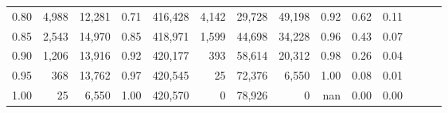 \begin{tabular}{rrrrrrrrrrrrrr}
0.80 &   4,988 &  12,281 &  0.71 &  416,428 &    4,142 &  29,728 &  49,198 &  0.92 &  0.62 &      0.11 \\
0.85 &   2,543 &  14,970 &  0.85 &  418,971 &    1,599 &  44,698 &  34,228 &  0.96 &  0.43 &      0.07 \\
0.90 &   1,206 &  13,916 &  0.92 &  420,177 &      393 &  58,614 &  20,312 &  0.98 &  0.26 &      0.04 \\
0.95 &     368 &  13,762 &  0.97 &  420,545 &       25 &  72,376 &   6,550 &  1.00 &  0.08 &      0.01 \\
1.00 &      25 &   6,550 &  1.00 &  420,570 &        0 &  78,926 &       0 &   nan &  0.00 &      0.00 \\
\bottomrule
\end{tabular}
